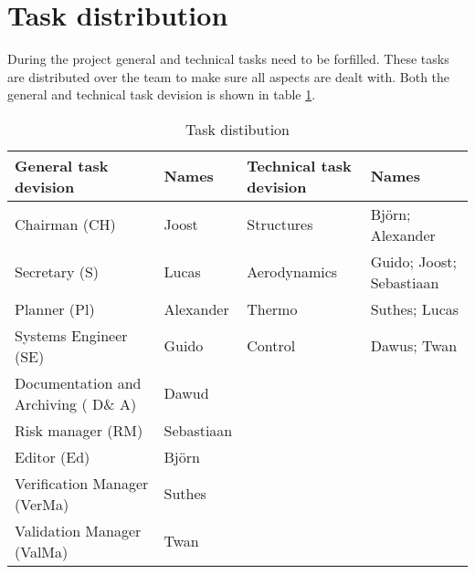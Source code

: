 \section{Task distribution}
During the project general and technical tasks need to be forfilled. These tasks are distributed over the team to make sure all aspects are dealt with. Both the general and technical task devision is shown in table \ref{tab:taskdist}.

\begin{table}[H]
	\caption {Task distibution}
    \begin{tabular}{|p{}|p{}|p{}|p{}|}
    \hline
    General task devision                 & Names      & Technical task devision & Names                    \\ \hline \hline
    Chairman (CH)                         & Joost      & Structures              & Bj\"{o}rn; Alexander         \\ \hline
    Secretary (S)                         & Lucas      & Aerodynamics            & Guido; Joost; Sebastiaan \\ \hline
    Planner (Pl)                         & Alexander  & Thermo                  & Suthes; Lucas            \\ \hline
    Systems Engineer (SE)                 & Guido      & Control                 & Dawus; Twan              \\ \hline
    Documentation and Archiving ( D\& A) & Dawud      & ~                       & ~                        \\ \hline
    Risk manager (RM)                   & Sebastiaan & ~                       & ~                        \\ \hline
    Editor (Ed)                           & Bj\"{o}rn      & ~                       & ~                        \\ \hline
    Verification Manager (VerMa)                    & Suthes     & ~                       & ~                        \\ \hline
    Validation Manager (ValMa)                      & Twan       & ~                       & ~                        \\ \hline
    \end{tabular}
    \label{tab:taskdist}
\end{table}